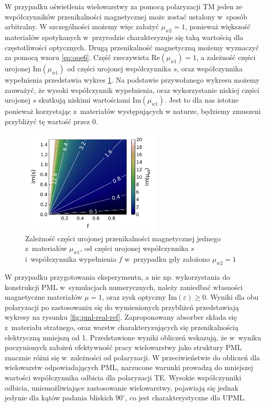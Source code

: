 W przypadku oświetlenia wielowarstwy za pomocą polaryzacji TM jeden ze współczynników przenikalności magnetycznej może zostać ustalony w~sposób arbitralny. W szczególności możemy więc założyć $\mu_{w2}=1$, ponieważ większość materiałów spotykanych w~przyrodzie charakteryzuje się taką wartością dla częstotliwości optycznych. Drugą przenikalność magnetyczną możemy wyznaczyć za pomocą wzoru \ref{eq:oqe6}. Część rzeczywista $\textrm{Re}(\mu_{w1})=1$, a zależność części urojonej $\textrm{Im}(\mu_{w1})$ od części urojonej współczynnika $s$, oraz współczynnika wypełnienia przedstawia wykres \ref{fig:im-mu1}. Na podstawie przywołanego wykresu możemy zauważyć, że wysoki współczynnik wypełnienia, oraz wykorzystanie niskiej części urojonej $s$ skutkują niskimi wartościami $\textrm{Im}(\mu_{w1})$. Jest to dla nas istotne ponieważ korzystając z~materiałów występujących w naturze, będziemy zmuszeni przybliżyć tę wartość przez $0$.

\begin{figure}
	\includegraphics[width=0.6\textwidth]{images/pml/fig4.png}
	\caption{Zależność części urojonej przenikalności magnetycznej jednego z~materiałów $\mu_{w1}$, od części urojonej współczynnika $s$ i~współczynnika wypełnienia $f$ w~przypadku gdy założono $\mu_{w2}=1$}
	\label{fig:im-mu1}
\end{figure}


W przypadku przygotowania eksperymentu, a nie np. wykorzystania do konstrukcji PML w~symulacjach  numerycznych, należy zaniedbać własności magnetyczne materiałów $\mu=1$, oraz zysk optyczny $\textrm{Im}(\varepsilon)\ge0$. Wyniki dla obu polaryzacji po zastosowaniu się do wymienionych przybliżeń przedstawiają wykresy na rysunku \ref{fig:pml-real-ref}. Zaproponowany absorber składa się z~materiału stratnego, oraz warstw charakteryzujących się przenikalnością elektryczną mniejszą od 1. Przedstawione wyniki obliczeń wskazują, że w~wyniku poczynionych założeń efektywność pracy wielowarstwy jako struktury PML znacznie różni się w~zależności od polaryzacji. W przeciwieństwie do obliczeń dla wielowarstw odpowiadających PML, narzucone warunki prowadzą do mniejszej wartości współczynnika odbicia dla polaryzacji TE. Wysokie współczynniki odbicia, uniemożliwiające zastosowanie wielowarstwy,  pojawiają się jednak jedynie dla kątów padania bliskich $90^{\circ}$, co jest charakterystyczne dla UPML.

